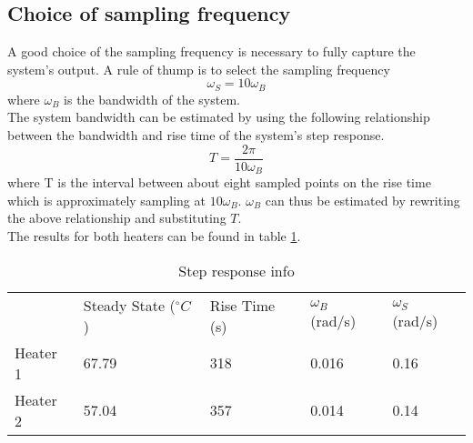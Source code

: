 \subsection{Choice of sampling frequency}

%     

A good choice of the sampling frequency is necessary to fully capture the system's output.
A rule of thump is to select the sampling frequency 
$$
\omega_S = 10\omega_B
$$
where $\omega_B$ is the bandwidth of the system. \\

\noindent The system bandwidth can be estimated by using the following relationship between the bandwidth and rise time of the system's step response.
$$
 T = \frac{2\pi}{10\omega_B}
$$
where T is the interval between about eight sampled points on the rise time which is approximately sampling at $10\omega_B$. $\omega_B$ can thus be estimated by rewriting the above relationship and substituting $T$. \\

\noindent The results for both heaters can be found in table \ref{Tab:stepInfo}.

\begin{table}[ht]
\centering
\begin{tabular}{lllll}
 & Steady State ($^{\circ}C$) & Rise Time (s) & $\omega_B$ (rad/s) & $\omega_S$ (rad/s) \\ \cline{2-5} 
Heater 1 & 67.79 & 318 & 0.016 & 0.16 \\
Heater 2 & 57.04 & 357 & 0.014 & 0.14
\end{tabular}
\caption{Step response info}
\label{Tab:stepInfo}
\end{table}